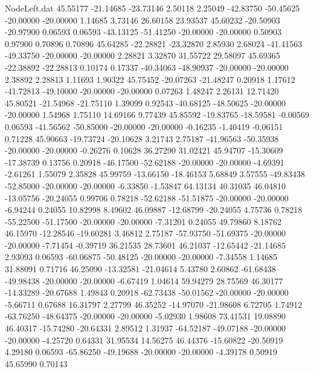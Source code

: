 \begin{filecontents}{NodeLeft.dat}
  45.55177  -21.14685  -23.73146     2.50118    2.25049  -42.83750  -50.45625  -20.00000  -20.00000    1.14685    3.73146   26.60158   23.93537
  45.60232  -20.50903  -20.97900     0.06593    0.06593  -43.13125  -51.41250  -20.00000  -20.00000    0.50903    0.97900    0.70896    0.70896
  45.64285  -22.28821  -23.32870     2.85930    2.68024  -41.41563  -49.33750  -20.00000  -20.00000    2.28821    3.32870   31.55722   29.58097
  45.69365  -22.38892  -22.28813     0.10174    0.17337  -40.34063  -48.90937  -20.00000  -20.00000    2.38892    2.28813    1.11693    1.90322
  45.75452  -20.07263  -21.48247     0.20918    1.17612  -41.72813  -49.10000  -20.00000  -20.00000    0.07263    1.48247    2.26131   12.71420
  45.80521  -21.54968  -21.75110     1.39099    0.92543  -40.68125  -48.50625  -20.00000  -20.00000    1.54968    1.75110   14.69166    9.77439
  45.85592  -19.83765  -18.59581    -0.00569    0.06593  -41.56562  -50.85000  -20.00000  -20.00000   -0.16235   -1.40419   -0.06151    0.71228
  45.90663  -19.73724  -20.10628     3.21743    2.75187  -41.96563  -50.35938  -20.00000  -20.00000   -0.26276    0.10628   36.27290   31.02421
  45.94707  -15.30609  -17.38739     0.13756    0.20918  -46.17500  -52.62188  -20.00000  -20.00000   -4.69391   -2.61261    1.55079    2.35828
  45.99759  -13.66150  -18.46153     5.68849    3.57555  -49.83438  -52.85000  -20.00000  -20.00000   -6.33850   -1.53847   64.13134   40.31035
  46.04810  -13.05756  -20.24055     0.99706    0.78218  -52.62188  -51.51875  -20.00000  -20.00000   -6.94244    0.24055   10.82998    8.49602
  46.09887  -12.68799  -20.24055     4.75736    0.78218  -55.22500  -51.17500  -20.00000  -20.00000   -7.31201    0.24055   49.79860    8.18762
  46.15970  -12.28546  -19.60281     3.46812    2.75187  -57.93750  -51.69375  -20.00000  -20.00000   -7.71454   -0.39719   36.21535   28.73601
  46.21037  -12.65442  -21.14685     2.93093    0.06593  -60.06875  -50.48125  -20.00000  -20.00000   -7.34558    1.14685   31.88091    0.71716
  46.25090  -13.32581  -21.04614     5.43780    2.60862  -61.68438  -49.98438  -20.00000  -20.00000   -6.67419    1.04614   59.94279   28.75569
  46.30177  -14.33289  -20.67688     1.49843    0.20918  -62.73438  -50.01562  -20.00000  -20.00000   -5.66711    0.67688   16.31797    2.27799
  46.35252  -14.97070  -21.98608     6.72705    1.74912  -63.76250  -48.64375  -20.00000  -20.00000   -5.02930    1.98608   73.41531   19.08890
  46.40317  -15.74280  -20.64331     2.89512    1.31937  -64.52187  -49.07188  -20.00000  -20.00000   -4.25720    0.64331   31.95534   14.56275
  46.44376  -15.60822  -20.50919     4.29180    0.06593  -65.86250  -49.19688  -20.00000  -20.00000   -4.39178    0.50919   45.65990    0.70143

\end{filecontents}

